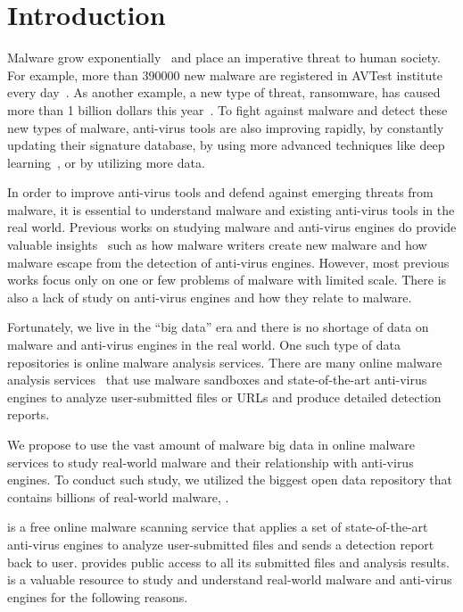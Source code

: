 \section{Introduction}
\label{sec:intro}

Malware grow exponentially~\cite{avtest} and place an imperative threat to human society. 
For example, more than 390000 new malware are registered in AVTest institute every day~\cite{avtest}.
As another example, a new type of threat, ransomware, has caused more than 1 billion dollars this year~\cite{ransomware}. 
To fight against malware and detect these new types of malware, anti-virus tools are also improving rapidly,
by constantly updating their signature database, by using more advanced techniques like deep learning~\cite{cylance}, or by utilizing more data. 

In order to improve anti-virus tools and defend against emerging threats from malware, 
it is essential to understand malware and existing anti-virus tools in the real world. 
Previous works on studying malware and anti-virus engines do provide valuable 
insights~\cite{ZhouSP2012,GuptaComsnets2009, vendors-study} such as  
how malware writers create new malware and how malware escape from the detection of anti-virus engines.
However, most previous works focus only on one or few problems of malware with limited scale. 
There is also a lack of study on anti-virus engines
and how they relate to malware.  

Fortunately, we live in the ``big data'' era and there is no shortage of data on malware and anti-virus
engines in the real world. One such type of data repositories is online malware analysis services. There
are many online malware analysis services~\cite{virustotal,malwr,vxstream,anubis} that use malware sandboxes and state-of-the-art
anti-virus engines to analyze user-submitted files or URLs and produce detailed detection reports. 

We propose to use the vast amount of malware big data in online malware services
to study real-world malware and their relationship with anti-virus engines.
To conduct such study, we utilized the biggest open data repository
that contains billions of real-world malware, {\em \vt}.

\vt{} is a free online malware scanning service
that applies a set of state-of-the-art anti-virus engines to analyze user-submitted files 
and sends a detection report back to user.
\vt{} provides public access to all its submitted files and analysis results. 
\vt{} is a valuable resource to study and 
understand real-world malware and anti-virus engines for the following reasons. 

